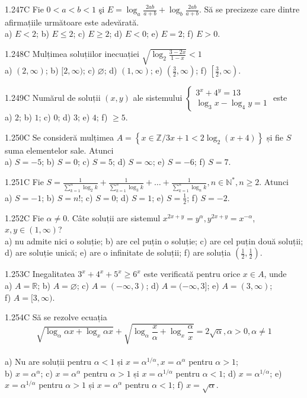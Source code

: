 \documentclass[11pt]{article}
\begin{document}
1.247C Fie $0<a<b<1$ şi $E=\log _{a} \frac{2 a b}{a+b}+\log _{b} \frac{2 a b}{a+b}$. Să se precizeze care dintre afirmațiile următoare este adevărată.\\ a) $E<2$; b) $E \leq 2$; c) $E \geq 2$; d) $E<0$; e) $E=2$; f) $E>0$.

1.248C Mulțimea soluțiilor inecuației $\sqrt{\log _{2} \frac{3-2 x}{1-x}}<1$\\ a) $(2, \infty)$; b) $[2, \infty)$; c) $\varnothing$; d) $(1, \infty)$; e) $\left(\frac{3}{2}, \infty\right)$; f) $\left[\frac{3}{2}, \infty\right)$.

1.249C Numărul de soluții $(x, y)$ ale sistemului $\left\{\begin{array}{l}3^{x}+4^{y}=13 \\ \log _{3} x-\log _{4} y=1\end{array}\right.$ este\\ a) $2$; b) $1$; c) $0$; d) $3$; e) $4$; f) $\geq 5$.

1.250C Se consideră mulțimea $A=\left\{x \in \mathbb{Z} / 3 x+1<2 \log _{2}(x+4)\right\}$ și fie $S$ suma elementelor sale. Atunci\\ a) $S=-5$; b) $S=0$; c) $S=5$; d) $S=\infty$; e) $S=-6$; f) $S=7$.

1.251C Fie $S=\frac{1}{\sum_{k=1}^{n} \log _{2} k}+\frac{1}{\sum_{k=1}^{n} \log _{3} k}+\ldots+\frac{1}{\sum_{k=1}^{n} \log _{n} k}, n \in \mathbb{N}^{*}, n \geq 2$. Atunci\\ a) $S=-1$; b) $S=n!$; c) $S=0$; d) $S=1$; e) $S=\frac{1}{2}$; f) $S=-2$.

1.252C Fie $\alpha \neq 0$. Câte soluții are sistemul $x^{2 x+y}=y^{\alpha}, y^{2 x+y}=x^{-\alpha}$, $x, y \in(1, \infty)$?\\ a) nu admite nici o soluție; b) are cel puțin o soluție; c) are cel puțin două soluții; d) are soluție unică; e) are o infinitate de soluții; f) are soluția $\left(\frac{1}{2}, \frac{1}{2}\right)$.

1.253C Inegalitatea $3^{x}+4^{x}+5^{x} \geq 6^{x}$ este verificată pentru orice $x \in A$, unde\\ a) $A=\mathbb{R}$; b) $A=\varnothing$; c) $A=(-\infty, 3)$; d) $A=(-\infty, 3]$; e) $A=(3, \infty)$;\\ f) $A=[3, \infty)$.

1.254C Să se rezolve ecuația $$\sqrt{\log _{\alpha} \alpha x+\log _{x} \alpha x}+\sqrt{\log _{\alpha} \frac{x}{\alpha}+\log _{x} \frac{\alpha}{x}}=2 \sqrt{\alpha}, \alpha>0, \alpha \neq 1$$\\ a) $\mathrm{Nu}$ are soluții pentru $\alpha<1$ și $x=\alpha^{1 / \alpha}, x=\alpha^{\alpha}$ pentru $\alpha>1$;\\ b) $x=\alpha^{\alpha}$; c) $x=\alpha^{\alpha}$ pentru $\alpha>1$ și $x=\alpha^{1 / \alpha}$ pentru $\alpha<1$; d) $x=\alpha^{1 / \alpha}$; e) $x=\alpha^{1 / \alpha}$ pentru $\alpha>1$ și $x=\alpha^{\alpha}$ pentru $\alpha<1$; f) $x=\sqrt{\alpha}$.
\end{document}

